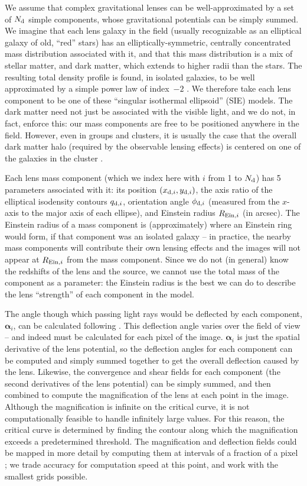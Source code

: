 \documentclass[iop]{emulateapj}
\def\eg{{\it e.g.}\,}
\def\xdi{x_{{\rm d},i}}
\def\ydi{y_{{\rm d},i}}
\def\phidi{\phi_{{\rm d},i}}
\def\qdi{q_{{\rm d},i}}
\def\Reini{R_{{\rm Ein},i}}
\def\alphai{\boldsymbol{\alpha}_{i}}
\def\Nd{N_{\rm d}}
\begin{document}
We assume that complex gravitational lenses can be well-approximated by a set
of $\Nd$ simple components, whose gravitational potentials can be simply
summed. We imagine that each lens galaxy in the field (usually recognizable as
an elliptical galaxy of old, ``red'' stars) has an elliptically-symmetric,
centrally concentrated mass distribution associated with it, and that this
mass distribution is a mix of stellar matter, and dark matter, which  extends
to higher radii than the stars.  The resulting total density profile is found,
in isolated galaxies, to be well approximated by a simple power law of
index~$-2$  \citep[see \eg][]{Koo++03}. We therefore take each lens component
to be one of these ``singular isothermal ellipsoid'' (SIE) models. The dark
matter need not just be associated with the visible light, and we do not, in
fact, enforce this: our mass components are free to be positioned anywhere in
the field. However, even in groups and clusters, it is usually the case that
the overall dark matter halo (required by the observable lensing effects) is
centered on one of the galaxies in the cluster \citep[see \eg][ for an extreme
example]{Bra++06}. 

Each lens mass component (which we index here with $i$ from 1 to $\Nd$) has 5
parameters associated with it: its position $(\xdi,\ydi)$, the axis ratio of
the elliptical isodensity contours $\qdi$, orientation angle $\phidi$
(measured from the $x$-axis to the major axis of each ellipse), and Einstein
radius $\Reini$ (in arcsec). The Einstein radius of a mass component is
(approximately) where an Einstein ring would form, if that component was an
isolated galaxy -- in practice, the nearby mass components will contribute
their own  lensing effects and the images will not appear at $\Reini$ from the
mass component. Since we do not (in general) know the redshifts of the lens
and the source, we cannot use the total mass of the component as a parameter:
the Einstein radius is the best we can do to describe the lens ``strength'' of
each component in the model.

The angle though which passing light rays would be deflected by each component,
$\alphai$, can be calculated following \citet{KSB94}.  This deflection angle
varies over the field of view -- and indeed must be calculated for each pixel of
the image. $\alphai$ is just the spatial derivative of the lens potential, so
the deflection angles for each component can be computed and simply summed
together to get the overall deflection caused by the lens. Likewise, the
convergence and shear fields for each component (the second derivatives of the
lens potential) can be simply summed, and then combined to compute the
magnification of the lens at each point in the image. Although the magnification
is infinite on the critical curve, it is not computationally feasible to handle
infinitely large values. For this reason, the critical curve is determined by
finding the contour along which the magnification exceeds a predetermined
threshold. The magnification and deflection fields could be mapped in more
detail by computing them at intervals of a fraction of a pixel \citep[as
in][]{Mar++07}; we trade accuracy for computation speed at this point, and work
with the smallest grids possible. 
\end{document}
